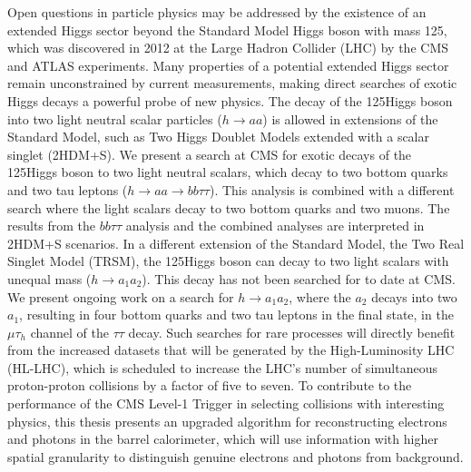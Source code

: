 Open questions in particle physics may be addressed by the existence of an extended Higgs sector beyond the Standard Model Higgs boson with mass 125\GeV, which was discovered in 2012 at the Large Hadron Collider (LHC) by the CMS and ATLAS experiments. Many properties of a potential extended Higgs sector remain unconstrained by current measurements, making direct searches of exotic Higgs decays a powerful probe of new physics. The decay of the 125\GeV Higgs boson into two light neutral scalar particles ($h\rightarrow aa$) is allowed in extensions of the Standard Model, such as Two Higgs Doublet Models extended with a scalar singlet (2HDM+S). We present a search at CMS for exotic decays of the 125\GeV Higgs boson to two light neutral scalars, which decay to two bottom quarks and two tau leptons ($h\rightarrow aa \rightarrow bb\tau\tau$). This analysis is combined with a different search where the light scalars decay to two bottom quarks and two muons. The results from the $bb\tau\tau$ analysis and the combined analyses are interpreted in 2HDM+S scenarios. In a different extension of the Standard Model, the Two Real Singlet Model (TRSM), the 125\GeV Higgs boson can decay to two light scalars with unequal mass ($h \rightarrow a_1 a_2$). This decay has not been searched for to date at CMS. We present ongoing work on a search for $h\rightarrow a_1 a_2$, where the $a_2$ decays into two $a_1$, resulting in four bottom quarks and two tau leptons in the final state, in the $\mu\tau_{h}$ channel of the $\tau\tau$ decay. Such searches for rare processes will directly benefit from the increased datasets that will be generated by the High-Luminosity LHC (HL-LHC), which is scheduled to increase the LHC's number of simultaneous proton-proton collisions by a factor of five to seven. To contribute to the performance of the CMS Level-1 Trigger in selecting collisions with interesting physics, this thesis presents an upgraded algorithm for reconstructing electrons and photons in the barrel calorimeter, which will use information with higher spatial granularity to distinguish genuine electrons and photons from background.